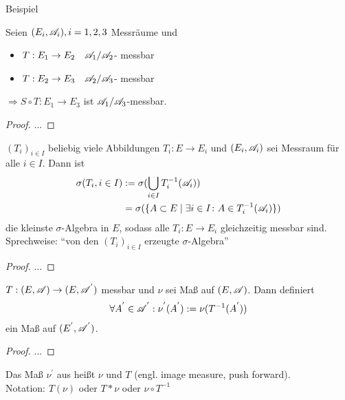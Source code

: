 Beispiel\\

\begin{proposition}
	Seien $(E_i, \mathscr{A}_i), i = 1,2,3$ Messräume und
	\begin{itemize}
		\item $T: E_1 \to E_2 \quad \mathscr{A}_1 / \mathscr{A}_2$- messbar
		\item $T: E_2 \to E_3 \quad \mathscr{A}_2 / \mathscr{A}_3$- messbar
	\end{itemize}
	$\Rightarrow S \circ T: E_1 \to E_3$ ist $\mathscr{A}_1 / \mathscr{A}_3$-messbar.
\end{proposition}

\begin{proof}
	...
\end{proof}

\begin{lemma}
	$(T_i)_{i \in I}$ beliebig viele Abbildungen $T_i: E \to E_i$ und $(E_i, \mathscr{A}_i)$ sei Messraum für alle $i \in I$. Dann ist 
	\begin{align}
		\sigma(T_i, i \in I) &:= \sigma(\bigcup_{i \in I}T^{-1}_i(\mathscr{A}_i))\notag \\
		&= \sigma( \{A \subset E \mid \exists i \in I\colon A \in T^{-1}_i(\mathscr{A}_i)\})
	\end{align}
	die kleinste $\sigma$-Algebra in $E$, sodass alle $T_i: E \to E_i$ gleichzeitig messbar sind.\\
	Sprechweise: ``von den $(T_i)_{i\in I}$ erzeugte $\sigma$-Algebra''
\end{lemma}

\begin{proof}
	...
\end{proof}

\begin{proposition}[Bildmaß]
	$T: (E, \mathscr{A}) \to (E, \mathscr{A}^{'})$ messbar und $\nu$ sei Maß auf $(E, \mathscr{A})$. Dann definiert
	\begin{align}
		\forall A^{'} \in \mathscr{A}^{'}: \nu^{'}(A^{'}) := \nu(T^{-1}(A^{'}))
	\end{align}
	ein Maß auf $(E^{'}, \mathscr{A}^{'})$.
\end{proposition}

\begin{proof}
	...
\end{proof}

\begin{definition}[Bildmaß]
	Das Maß $\nu^{'}$ aus  heißt  $\nu$ und $T$ (engl. image measure, push forward).\\
	Notation: $T(\nu)$ oder $T\ast \nu$ oder $\nu \circ T^{-1}$
\end{definition}

